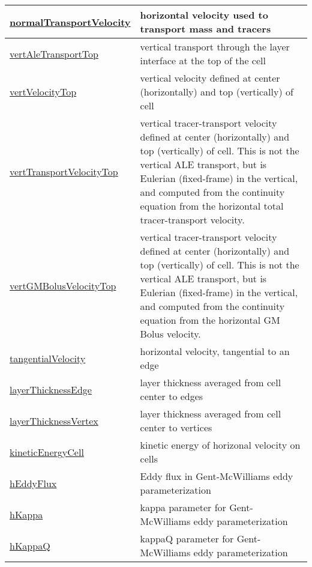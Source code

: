 {\begin{center}
\begin{longtable}{| p{2.0in} | p{4.0in} |}
    \hline
    \hyperref[subsec:var_sec_diagnostics_normalTransportVelocity]{normalTransportVelocity} & horizontal velocity used to transport mass and tracers \\
    \hline
    \hyperref[subsec:var_sec_diagnostics_vertAleTransportTop]{vertAleTransportTop} & vertical transport through the layer interface at the top of the cell \\
    \hline
    \hyperref[subsec:var_sec_diagnostics_vertVelocityTop]{vertVelocityTop} & vertical velocity defined at center (horizontally) and top (vertically) of cell \\
    \hline
    \hyperref[subsec:var_sec_diagnostics_vertTransportVelocityTop]{vertTransportVelocityTop} & vertical tracer-transport velocity defined at center (horizontally) and top (vertically) of cell.  This is not the vertical ALE transport, but is Eulerian (fixed-frame) in the vertical, and computed from the continuity equation from the horizontal total tracer-transport velocity. \\
    \hline
    \hyperref[subsec:var_sec_diagnostics_vertGMBolusVelocityTop]{vertGMBolusVelocityTop} & vertical tracer-transport velocity defined at center (horizontally) and top (vertically) of cell.  This is not the vertical ALE transport, but is Eulerian (fixed-frame) in the vertical, and computed from the continuity equation from the horizontal GM Bolus velocity. \\
    \hline
    \hyperref[subsec:var_sec_diagnostics_tangentialVelocity]{tangentialVelocity} & horizontal velocity, tangential to an edge \\
    \hline
    \hyperref[subsec:var_sec_diagnostics_layerThicknessEdge]{layerThicknessEdge} & layer thickness averaged from cell center to edges \\
    \hline
    \hyperref[subsec:var_sec_diagnostics_layerThicknessVertex]{layerThicknessVertex} & layer thickness averaged from cell center to vertices \\
    \hline
    \hyperref[subsec:var_sec_diagnostics_kineticEnergyCell]{kineticEnergyCell} & kinetic energy of horizonal velocity on cells \\
    \hline
    \hyperref[subsec:var_sec_diagnostics_hEddyFlux]{hEddyFlux} & Eddy flux in Gent-McWilliams eddy parameterization \\
    \hline
    \hyperref[subsec:var_sec_diagnostics_hKappa]{hKappa} & kappa parameter for Gent-McWilliams eddy parameterization \\
    \hline
    \hyperref[subsec:var_sec_diagnostics_hKappaQ]{hKappaQ} & kappaQ parameter for Gent-McWilliams eddy parameterization \\

\end{longtable}
\end{center}}

